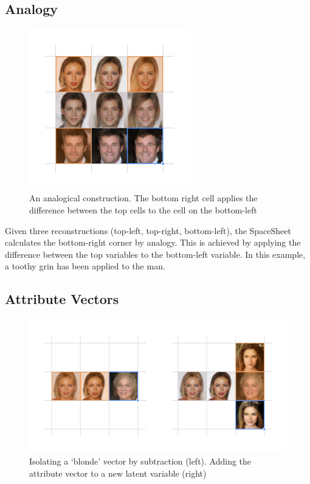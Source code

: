 \documentclass[letterpaper]{article}
\begin{document}
\subsection{Analogy}
\begin{figure}[ht!]
  \centering
  \includegraphics[width=7.0cm]{figs/07-analogy.jpg}
  \caption{An analogical construction. The bottom right cell applies the difference between the top cells to the cell on the bottom-left}
\end{figure}

Given three reconstructions (top-left, top-right, bottom-left), the SpaceSheet calculates the bottom-right corner by analogy. This is achieved by applying the difference between the top variables to the bottom-left variable. In this example, a toothy grin has been applied to the man.



\subsection{Attribute Vectors}
\begin{figure}[ht!]
  \centering
  \includegraphics[width=14cm]{figs/09-attribute-vectors.jpg}
  \caption{ Isolating a ‘blonde’ vector by subtraction (left). Adding the attribute vector to a new latent variable (right)}
\end{figure}
\end{document}
